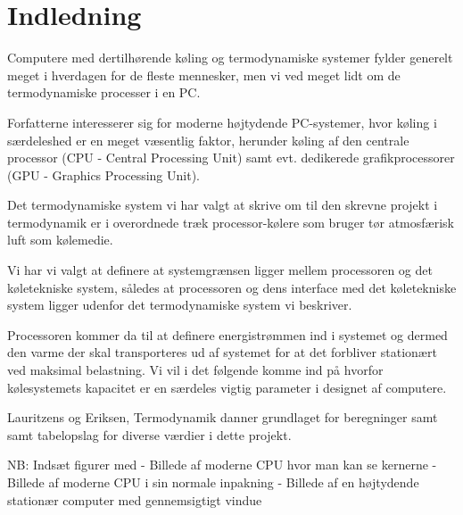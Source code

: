 \section{Indledning}

Computere med dertilhørende køling og termodynamiske systemer fylder generelt meget i hverdagen for de fleste mennesker, men vi ved meget lidt om de termodynamiske processer i en PC.

Forfatterne interesserer sig for moderne højtydende PC-systemer, hvor køling i særdeleshed er en meget væsentlig faktor, herunder køling af den centrale processor (CPU - Central Processing Unit) samt evt. dedikerede grafikprocessorer (GPU - Graphics Processing Unit).

Det termodynamiske system vi har valgt at skrive om til den skrevne projekt i termodynamik er i overordnede træk processor-kølere som bruger tør atmosfærisk luft som kølemedie.

Vi har vi valgt at definere at systemgrænsen ligger mellem processoren og det køletekniske system, således at processoren og dens interface med det køletekniske system ligger udenfor det termodynamiske system vi beskriver.

Processoren kommer da til at definere energistrømmen ind i systemet og dermed den varme der skal transporteres ud af systemet for at det forbliver stationært ved maksimal belastning. Vi vil i det følgende komme ind på hvorfor kølesystemets kapacitet er en særdeles vigtig parameter i designet af computere.

Lauritzens og Eriksen, Termodynamik danner grundlaget for beregninger samt samt tabelopslag for diverse værdier i dette projekt.

NB: Indsæt figurer med
- Billede af moderne CPU hvor man kan se kernerne
- Billede af moderne CPU i sin normale inpakning
- Billede af en højtydende stationær computer med gennemsigtigt vindue
